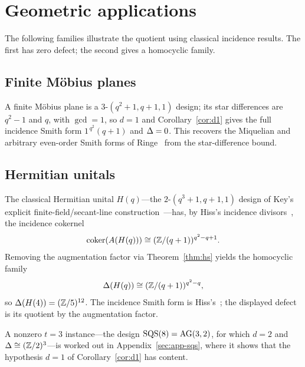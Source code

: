 \section{Geometric applications}

The following families illustrate the quotient using classical incidence
results. The first has zero defect; the second gives a homocyclic family.

\subsection{Finite M\"obius planes}

A finite M\"obius plane is a
$3$-$(q^{2}+1,q+1,1)$ design; its star differences are $q^{2}-1$ and $q$, with
$\gcd=1$, so $d=1$ and Corollary~\ref{cor:d1} gives the full incidence Smith
form $1^{\,q^{2}}(q+1)$ and $\Delta=0$. This recovers the Miquelian and arbitrary even-order Smith forms
of Ringe~\cite{Ringe2008} from the star-difference bound.

\subsection{Hermitian unitals}

The classical Hermitian unital $H(q)$---the
$2$-$(q^{3}+1,q+1,1)$ design of Key's explicit finite-field/secant-line
construction~\cite{Key}---has, by Hiss's incidence divisors~\cite{Hiss},
the incidence cokernel
\[
  \operatorname{coker}(A(H(q)))\cong(\mathbb{Z}/(q+1))^{q^{2}-q+1}.
\]
Removing the augmentation factor via Theorem~\ref{thm:hs} yields the
homocyclic family
\[
  \Delta(H(q))\cong(\mathbb{Z}/(q+1))^{q^{2}-q},
\]
so $\Delta(H(4))=(\mathbb{Z}/5)^{12}$. The incidence Smith form is Hiss's~\cite{Hiss}; the displayed defect
is its quotient by the augmentation factor.

A nonzero $t=3$ instance---the design $\mathrm{SQS}(8)=\mathrm{AG}(3,2)$, for which $d=2$ and
$\Delta\cong(\mathbb{Z}/2)^{3}$---is worked out in Appendix~\ref{sec:app-sqs}, where it
shows that the hypothesis $d=1$ of Corollary~\ref{cor:d1} has content.
